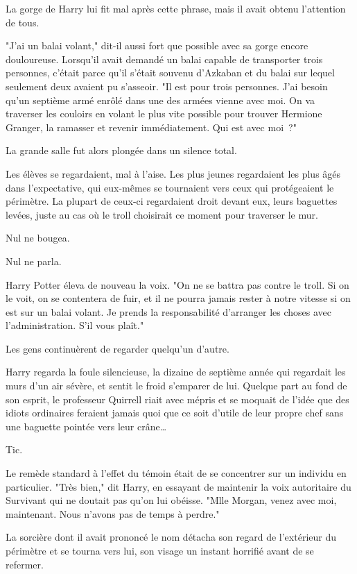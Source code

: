 La gorge de Harry lui fit mal après cette phrase, mais il avait obtenu l'attention de tous.

"J'ai un balai volant," dit-il aussi fort que possible avec sa gorge encore douloureuse. Lorsqu'il avait demandé un balai capable de transporter trois personnes, c'était parce qu'il s'était souvenu d'Azkaban et du balai sur lequel seulement deux avaient pu s'asseoir. "Il est pour trois personnes. J'ai besoin qu'un septième armé enrôlé dans une des armées vienne avec moi. On va traverser les couloirs en volant le plus vite possible pour trouver Hermione Granger, la ramasser et revenir immédiatement. Qui est avec moi~?"

La grande salle fut alors plongée dans un silence total.

Les élèves se regardaient, mal à l'aise. Les plus jeunes regardaient les plus âgés dans l'expectative, qui eux-mêmes se tournaient vers ceux qui protégeaient le périmètre. La plupart de ceux-ci regardaient droit devant eux, leurs baguettes levées, juste au cas où le troll choisirait ce moment pour traverser le mur.

Nul ne bougea.

Nul ne parla.

Harry Potter éleva de nouveau la voix. "On ne se battra pas contre le troll. Si on le voit, on se contentera de fuir, et il ne pourra jamais rester à notre vitesse si on est sur un balai volant. Je prends la responsabilité d'arranger les choses avec l'administration. S'il vous plaît."

Les gens continuèrent de regarder quelqu'un d'autre.

Harry regarda la foule silencieuse, la dizaine de septième année qui regardait les murs d'un air sévère, et sentit le froid s'emparer de lui. Quelque part au fond de son esprit, le professeur Quirrell riait avec mépris et se moquait de l'idée que des idiots ordinaires feraient jamais quoi que ce soit d'utile de leur propre chef sans une baguette pointée vers leur crâne…

Tic.

Le remède standard à l'effet du témoin était de se concentrer sur un individu en particulier. "Très bien," dit Harry, en essayant de maintenir la voix autoritaire du Survivant qui ne doutait pas qu'on lui obéisse. "Mlle Morgan, venez avec moi, maintenant. Nous n'avons pas de temps à perdre."

La sorcière dont il avait prononcé le nom détacha son regard de l'extérieur du périmètre et se tourna vers lui, son visage un instant horrifié avant de se refermer.

